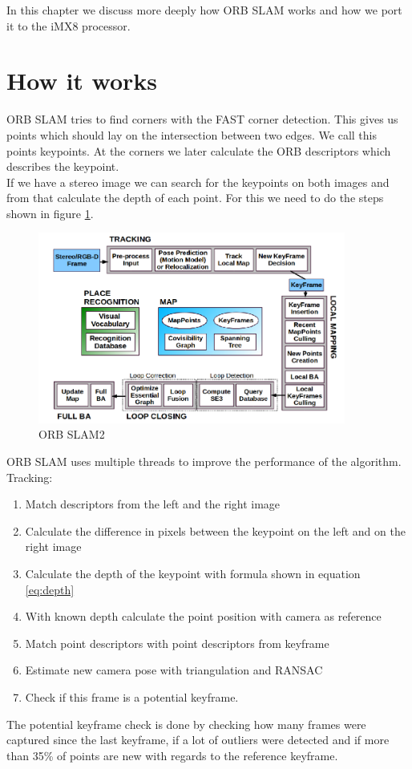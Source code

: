 \documentclass[11pt,a4paper,titlepage,oneside]{report}
\begin{document}
In this chapter we discuss more deeply how ORB SLAM works and how we port it to the iMX8 processor.

\section{How it works}
ORB SLAM tries to find corners with the FAST corner detection. This gives us points which should lay on the intersection between two edges. We call this points keypoints. At the corners we later calculate the ORB descriptors which describes the keypoint.\\
If we have a stereo image we can search for the keypoints on both images and from that calculate the depth of each point. For this we need to do the steps shown in figure \ref{fig:orb_slam2}.

\begin{figure}[H]
  \begin{center}
		\includegraphics[width=0.9\textwidth]{img/orb_slam2.png}
  \end{center}
	\caption{ORB SLAM2 \cite{orbslam2}}\label{fig:orb_slam2}
\end{figure}

ORB SLAM uses multiple threads to improve the performance of the algorithm. \\
Tracking:
\begin{enumerate}
	\item Match descriptors from the left and the right image
	\item Calculate the difference in pixels between the keypoint on the left and on the right image
	\item Calculate the depth of the keypoint with formula shown in equation \ref{eq:depth}
	\item With known depth calculate the point position with camera as reference
	\item Match point descriptors with point descriptors from keyframe
	\item Estimate new camera pose with triangulation and RANSAC
	\item Check if this frame is a potential keyframe.
\end{enumerate}
The potential keyframe check is done by checking how many frames were captured since the last keyframe, if a lot of outliers were detected and if more than 35\% of points are new with regards to the reference keyframe.\\
\end{document}
